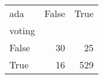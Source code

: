 \begin{tabular}{lrr}
\toprule
ada &  False &  True  \\
voting &        &        \\
\midrule
False  &     30 &     25 \\
True   &     16 &    529 \\
\bottomrule
\end{tabular}

